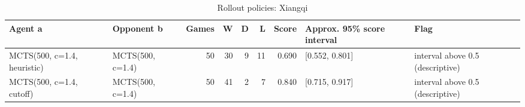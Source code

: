 \begin{table}[!t]
\centering
\caption{Rollout policies: Xiangqi}
\label{tab:rollout_xiangqi}
\small
\begin{tabular}{llrrrrrll}
\toprule
Agent a & Opponent b & Games & W & D & L & Score & Approx. 95\% score interval & Flag \\
\midrule
MCTS(500, c=1.4, heuristic) & MCTS(500, c=1.4) & 50 & 30 & 9 & 11 & 0.690 & [0.552, 0.801] & interval above 0.5 (descriptive) \\
MCTS(500, c=1.4, cutoff) & MCTS(500, c=1.4) & 50 & 41 & 2 & 7 & 0.840 & [0.715, 0.917] & interval above 0.5 (descriptive) \\
\bottomrule
\end{tabular}
\end{table}
